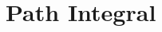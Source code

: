 \documentclass[12pt,a4paper]{article}
\begin{document}



\newcommand{\dd}{ d }











\section{Path Integral}
\end{document}

